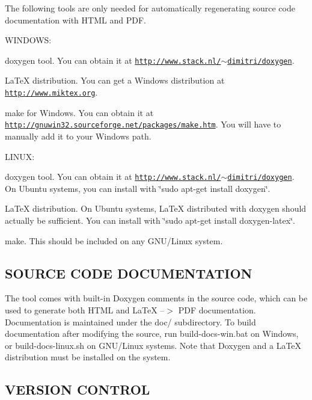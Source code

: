 The following tools are only needed for automatically regenerating source code documentation with H\+T\+M\+L and P\+D\+F.

W\+I\+N\+D\+O\+W\+S\+:


\begin{DoxyItemize}
\item doxygen tool. You can obtain it at \href{http://www.stack.nl/~dimitri/doxygen}{\tt http\+://www.\+stack.\+nl/$\sim$dimitri/doxygen}.
\item La\+Te\+X distribution. You can get a Windows distribution at \href{http://www.miktex.org}{\tt http\+://www.\+miktex.\+org}.
\item make for Windows. You can obtain it at \href{http://gnuwin32.sourceforge.net/packages/make.htm}{\tt http\+://gnuwin32.\+sourceforge.\+net/packages/make.\+htm}. You will have to manually add it to your Windows path.
\end{DoxyItemize}

L\+I\+N\+U\+X\+:


\begin{DoxyItemize}
\item doxygen tool. You can obtain it at \href{http://www.stack.nl/~dimitri/doxygen}{\tt http\+://www.\+stack.\+nl/$\sim$dimitri/doxygen}. On Ubuntu systems, you can install with \char`\"{}sudo apt-\/get install doxygen\char`\"{}.
\item La\+Te\+X distribution. On Ubuntu systems, La\+Te\+X distributed with doxygen should actually be sufficient. You can install with \char`\"{}sudo apt-\/get install doxygen-\/latex\char`\"{}.
\item make. This should be included on any G\+N\+U/\+Linux system. 

 \subsection*{S\+O\+U\+R\+C\+E C\+O\+D\+E D\+O\+C\+U\+M\+E\+N\+T\+A\+T\+I\+O\+N }
\end{DoxyItemize}

The tool comes with built-\/in Doxygen comments in the source code, which can be used to generate both H\+T\+M\+L and La\+Te\+X --$>$ P\+D\+F documentation. Documentation is maintained under the doc/ subdirectory. To build documentation after modifying the source, run build-\/docs-\/win.\+bat on Windows, or build-\/docs-\/linux.\+sh on G\+N\+U/\+Linux systems. Note that Doxygen and a La\+Te\+X distribution must be installed on the system. 

 \subsection*{V\+E\+R\+S\+I\+O\+N C\+O\+N\+T\+R\+O\+L }

